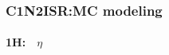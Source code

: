 \documentclass[usenames,dvipsnames]{beamer}
\begin{document}
\begin{frame}
\begin{minipage}{0.32\textwidth}
    \end{minipage}
\end{frame}

\begin{frame}
\frametitle{C1N2ISR:MC modeling}
\framesubtitle{1H:$\quad\eta$}
%    


\end{frame}
\end{document}
